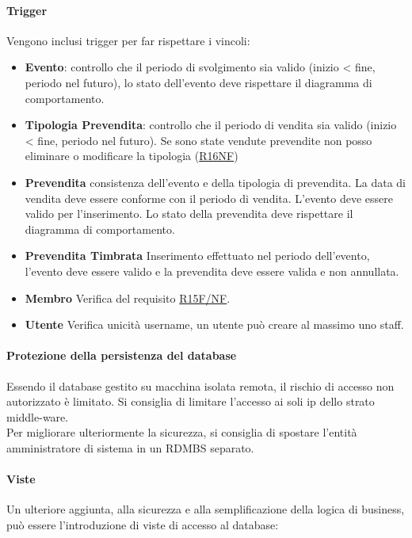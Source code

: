 \documentclass[a4paper]{article}
\begin{document}
\paragraph{Trigger} Vengono inclusi trigger per far rispettare i vincoli:

\begin{itemize}
    \item \textbf{Evento}: controllo che il periodo di svolgimento sia valido (inizio < fine, periodo nel futuro), lo stato dell'evento deve rispettare il diagramma di comportamento.
    \item \textbf{Tipologia Prevendita}: controllo che il periodo di vendita sia valido (inizio < fine, periodo nel futuro). Se sono state vendute prevendite non posso eliminare o modificare la tipologia (\hyperlink{R16NF}{R16NF})
    \item \textbf{Prevendita} consistenza dell'evento e della tipologia di prevendita. La data di vendita deve essere conforme con il periodo di vendita. L'evento deve essere valido per l'inserimento. Lo stato della prevendita deve rispettare il diagramma di comportamento.
    \item \textbf{Prevendita Timbrata} Inserimento effettuato nel periodo dell'evento, l'evento deve essere valido e la prevendita deve essere valida e non annullata.
    \item \textbf{Membro} Verifica del requisito \hyperlink{R15F/NF}{R15F/NF}.
    \item \textbf{Utente} Verifica unicità username, un utente può creare al massimo uno staff.
\end{itemize}

\paragraph{Protezione della persistenza del database} Essendo il database gestito su macchina isolata remota, il rischio di accesso non autorizzato è limitato. Si consiglia di limitare l'accesso ai soli ip dello strato middle-ware.\\Per migliorare ulteriormente la sicurezza, si consiglia di spostare l'entità amministratore di sistema in un RDMBS separato.

\paragraph{Viste} Un ulteriore aggiunta, alla sicurezza e alla semplificazione della logica di business, può essere l'introduzione di viste di accesso al database:
\end{document}
